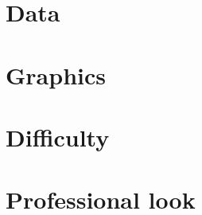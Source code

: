 \documentclass[11pt]{article}
\begin{document}
\section*{Data}

\vspace*{0.75in}



\section*{Graphics}

\vspace*{0.75in}


\section*{Difficulty}

\vspace*{0.75in}


\section*{Professional look}

\vspace*{0.75in}




\end{document}
